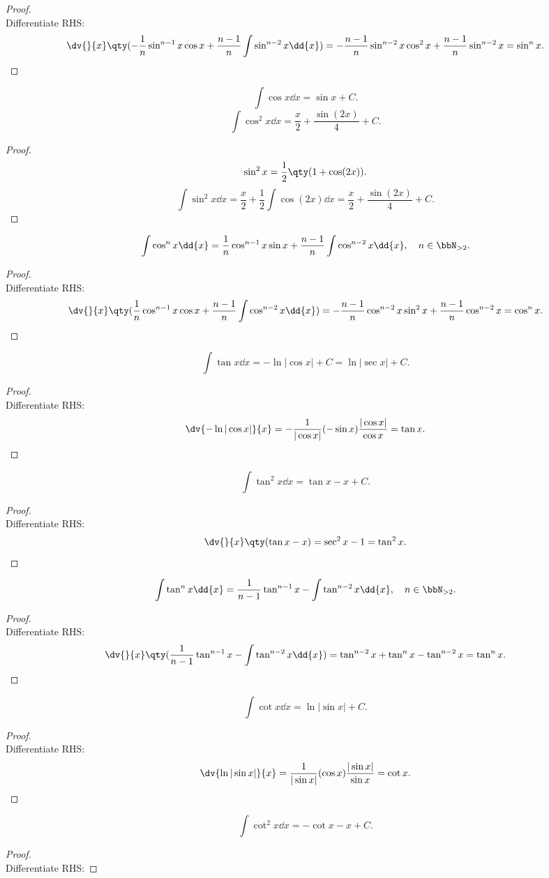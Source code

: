 \documentclass[a4paper,12pt]{report}
\begin{document}
\begin{itemize}
\begin{itemize}
\begin{proof}\mbox{}\\
    Differentiate RHS:
    \[\dv{}{x}\qty(-\frac{1}{n}\sin^{n-1}x\cos x+\frac{n-1}{n}\int\sin^{n-2}x\dd{x})=-\frac{n-1}{n}\sin^{n-2}x\cos^2 x+\frac{n-1}{n}\sin^{n-2}x=\sin^n x.\]
\end{proof}
\[\int\cos x\dd{x}=\sin x+C.\]
\[\int\cos^2 x\dd{x}=\frac{x}{2}+\frac{\sin(2x)}{4}+C.\]
\begin{proof}
    \[\sin^2 x=\frac{1}{2}\qty(1+\cos(2x)).\]
    \[\int\sin^2 x\dd{x}=\frac{x}{2}+\frac{1}{2}\int\cos(2x)\dd{x}=\frac{x}{2}+\frac{\sin(2x)}{4}+C.\]
\end{proof}
\[\int\cos^n x\dd{x}=\frac{1}{n}\cos^{n-1}x\sin x+\frac{n-1}{n}\int\cos^{n-2}x\dd{x},\quad n\in\bbN_{>2}.\]
\begin{proof}\mbox{}\\
    Differentiate RHS:
    \[\dv{}{x}\qty(\frac{1}{n}\cos^{n-1}x\cos x+\frac{n-1}{n}\int\cos^{n-2}x\dd{x})=-\frac{n-1}{n}\cos^{n-2}x\sin^2 x+\frac{n-1}{n}\cos^{n-2}x=\cos^n x.\]
\end{proof}
\[\int\tan x\dd{x}=-\ln|\cos x|+C=\ln|\sec x|+C.\]
\begin{proof}\mbox{}\\
    Differentiate RHS:
    \[\dv{-\ln|\cos x|}{x}=-\frac{1}{|\cos x|}(-\sin x)\frac{|\cos x|}{\cos x}=\tan x.\]
\end{proof}
\[\int\tan^2 x\dd{x}=\tan x-x+C.\]
\begin{proof}\mbox{}\\
    Differentiate RHS:
    \[\dv{}{x}\qty(\tan x-x)=\sec^2 x-1=\tan^2x.\]
\end{proof}
\[\int\tan^n x\dd{x}=\frac{1}{n-1}\tan^{n-1}x-\int\tan^{n-2}x\dd{x},\quad n\in\bbN_{>2}.\]
\begin{proof}\mbox{}\\
    Differentiate RHS:
    \[\dv{}{x}\qty(\frac{1}{n-1}\tan^{n-1}x-\int\tan^{n-2}x\dd{x})=\tan^{n-2}x+\tan^nx-\tan^{n-2}x=\tan^n x.\]
\end{proof}
\[\int\cot x\dd{x}=\ln|\sin x|+C.\]
\begin{proof}\mbox{}\\
    Differentiate RHS:
    \[\dv{\ln|\sin x|}{x}=\frac{1}{|\sin x|}(\cos x)\frac{|\sin x|}{\sin x}=\cot x.\]
\end{proof}
\[\int\cot^2 x\dd{x}=-\cot x-x+C.\]
\begin{proof}\mbox{}\\
    Differentiate RHS:

\end{proof}
\end{itemize}
\end{itemize}
\end{document}
